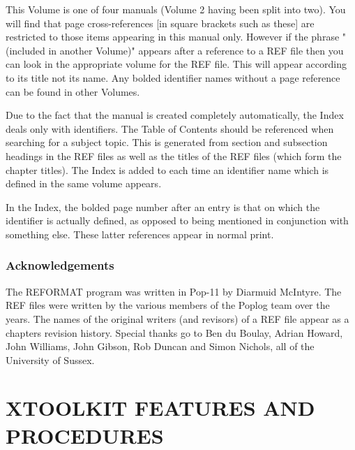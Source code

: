 This Volume is one of four manuals (Volume 2 having been split into
two). You will find that page cross-references [in square brackets such
as these] are restricted to those items appearing in this manual only.
However if the phrase "(included in another Volume)" appears after a
reference to a REF file then you can look in the appropriate volume for
the REF file. This will appear according to its title not its name.
Any bolded identifier names without a page reference can be found in
other Volumes.


Due to the fact that the manual is created completely automatically, the
Index deals only with identifiers. The Table of Contents should be
referenced when searching for a subject topic. This is generated from
section and subsection headings in the REF files as well as the titles
of the REF files (which form the chapter titles). The Index is added to each
time an identifier name which is defined in the same volume appears.

In the Index, the bolded page number after an entry is that on
which the identifier is actually defined, as opposed to being mentioned
in conjunction with something else. These latter references appear in
normal print.

\section*{Acknowledgements}

The REFORMAT program was written in Pop-11 by Diarmuid McIntyre. The REF
files were written by the various members of the Poplog team over the
years. The names of the original writers (and revisors) of a REF file
appear as a chapters revision history. Special thanks go to Ben du
Boulay, Adrian Howard, John Williams, John Gibson, Rob Duncan and Simon
Nichols, all of the University of Sussex.


\tableofcontents




\part{XTOOLKIT FEATURES AND PROCEDURES}

